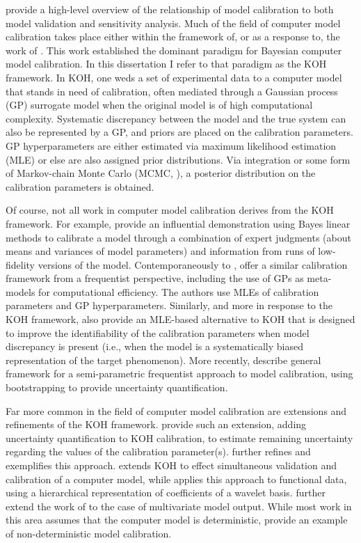 \documentclass[10pt,a4paper]{article}
\begin{document}

\citet{Trucano2006} provide a high-level overview of the relationship of model calibration to both model validation and sensitivity analysis.
Much of the field of computer model calibration takes place either within the framework of, or as a response to, the work of \citet{Kennedy2001}.
This work established the dominant paradigm for Bayesian computer model calibration.
In this dissertation I refer to that paradigm as the KOH framework.
In KOH, one weds a set of experimental data to a computer model that stands in need of calibration, often mediated through a Gaussian process (GP) surrogate model when the original model is of high computational complexity.
Systematic discrepancy between the model and the true system can also be represented by a GP, and priors are placed on the calibration parameters.
GP hyperparameters are either estimated via maximum likelihood estimation (MLE) or else are also assigned prior distributions.
Via integration or some form of Markov-chain Monte Carlo (MCMC, \cite{Gelfand1990}), a posterior distribution on the calibration parameters is obtained.

Of course, not all work in computer model calibration derives from the KOH framework.
For example, \citet{Craig1997} provide an influential demonstration using Bayes linear methods to calibrate a model through a combination of expert judgments (about means and variances of model parameters) and information from runs of low-fidelity versions of the model.
Contemporaneously to \citet{Kennedy2001}, \citet{Cox2001} offer a similar calibration framework from a frequentist perspective, including the use of GPs as meta-models for computational efficiency. 
The authors use MLEs of calibration parameters and GP hyperparameters.
Similarly, and more in response to the KOH framework, \citet{Loeppky2006} also provide an MLE-based alternative to KOH that is designed to improve the identifiability of the calibration parameters when model discrepancy is present (i.e., when the model is a systematically biased representation of the target phenomenon).
More recently, \citet{Wong2014} describe general framework for a semi-parametric frequentist approach to model calibration, using bootstrapping to provide uncertainty quantification.

Far more common in the field of computer model calibration are extensions and refinements of the KOH framework.
\citet{Higdon2004} provide such an extension, adding uncertainty quantification to KOH calibration, to estimate remaining uncertainty regarding the values of the calibration parameter(s).
\citet{Williams2006} further refines and exemplifies this approach.
\citet{Bayarri2007a} extends KOH to effect simultaneous validation and calibration of a computer model, while \citet{Bayarri2007b} applies this approach to functional data, using a hierarchical representation of coefficients of a wavelet basis.
\citet{Paulo2012} further extend the work of \citet{Bayarri2007a} to the case of multivariate model output.
While most work in this area assumes that the computer model is deterministic, \citet{Pratola2018} provide an example of non-deterministic model calibration.
\end{document}
